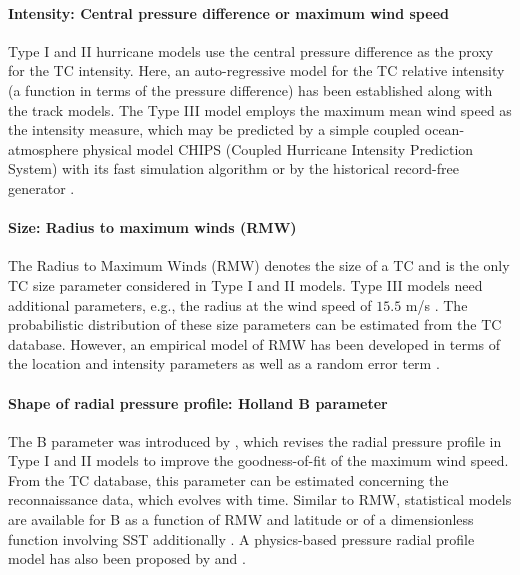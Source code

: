 \paragraph{Intensity: Central pressure difference or maximum wind speed} Type I and II hurricane models use the central pressure difference as the proxy for the TC intensity. Here, an auto-regressive model for the TC relative intensity (a function in terms of the pressure difference) has been established along with the track models. The Type III model employs the maximum mean wind speed as the intensity measure, which may be predicted by a simple coupled ocean-atmosphere physical model CHIPS (Coupled Hurricane Intensity Prediction System) with its fast simulation algorithm \citep{emanuel2011selfstratification,emanuel2017fast,emanuel2004environmental} or by the historical record-free generator \citep{emanuel2008hurricanes}. 

\paragraph{Size: Radius to maximum winds (RMW)} The Radius to Maximum Winds (RMW) denotes the size of a TC and is the only TC size parameter considered in Type I and II models. Type III models need additional parameters, e.g., the radius at the wind speed of $15.5$ m/s \citep{chavas2016model}. The probabilistic distribution of these size parameters can be estimated from the TC database. However, an empirical model of RMW has been developed in terms of the location and intensity parameters as well as a random error term \citep{vickery2008statistical, vickery2009hurricane-b}.

\paragraph{Shape of radial pressure profile: Holland B parameter} The B parameter was introduced by \cite{holland1980analytic}, which revises the radial pressure profile in Type I and II models to improve the goodness-of-fit of the maximum wind speed. From the TC database, this parameter can be estimated concerning the reconnaissance data, which evolves with time. Similar to RMW, statistical models are available for B as a function of RMW and latitude \citep{powell2005state} or of a dimensionless function involving SST additionally \citep{vickery2008statistical}. A physics-based pressure radial profile model has also been proposed by \cite{holland2008revised} and \cite{holland2010revised}.

